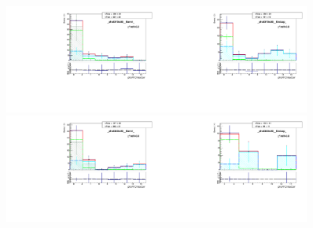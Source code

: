 \begin{figure}[htb]
  \begin{center}
   \includegraphics[width=0.45\textwidth]{../figs/figs_v11/ELECTRON_WGamma/MCclosureWjetsPlusWg/c_TEMPL_CHISO_UNblind__phoEt75to85__Barrel__RooFit_MCclosure.pdf}\includegraphics[width=0.45\textwidth]{../figs/figs_v11/ELECTRON_WGamma/MCclosureWjetsPlusWg/c_TEMPL_CHISO_UNblind__phoEt75to85__Endcap__RooFit_MCclosure.pdf}\\
   \includegraphics[width=0.45\textwidth]{../figs/figs_v11/ELECTRON_WGamma/MCclosureWjetsPlusWg/c_TEMPL_CHISO_UNblind__phoEt85to95__Barrel__RooFit_MCclosure.pdf}\includegraphics[width=0.45\textwidth]{../figs/figs_v11/ELECTRON_WGamma/MCclosureWjetsPlusWg/c_TEMPL_CHISO_UNblind__phoEt85to95__Endcap__RooFit_MCclosure.pdf}\\

\end{center}
\end{figure}
